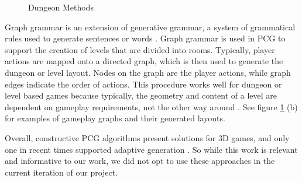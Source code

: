\documentclass[11pt, oneside]{article}
\begin{document}
\begin{normalsize}
\begin{figure}[H]%
    \centering
    \qquad
    \caption{Dungeon Methods}%
    \label{fig:dungeon}%
\end{figure}

Graph grammar is an extension of generative grammar, a system of grammatical rules used to generate sentences or words \cite{thompson2017generative}. Graph grammar is used in PCG to support the creation of levels that are divided into rooms. Typically, player actions are mapped onto a directed graph, which is then used to generate the dungeon or level layout. Nodes on the graph are the player actions, while graph edges indicate the order of actions. This procedure works well for dungeon or level based games because typically, the geometry and content of a level are dependent on gameplay requirements, not the other way around \cite{van2013designing}. See figure \ref{fig:dungeon} (b) for examples of gameplay graphs and their generated layouts.

Overall, constructive PCG algorithms present solutions for 3D games, and only one in recent times supported adaptive generation \cite{viana2019survey}. So while this work is relevant and informative to our work, we did not opt to use these approaches in the current iteration of our project.


\end{normalsize}
\end{document}
